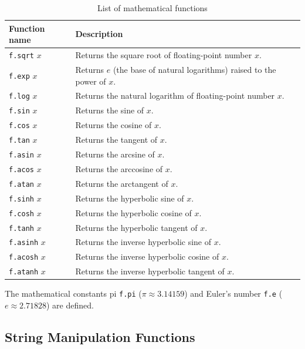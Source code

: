 \begin{table}[h]
  \begin{center}
    \begin{tabular}{ | l | p{9cm} |}
    \hline
    Function name & Description \\ \hline
    \texttt{f.sqrt} $x$ & Returns the square root of floating-point number $x$. \\ \hline
    \texttt{f.exp} $x$ & Returns $e$ (the base of natural logarithms) raised to the power of $x$. \\ \hline
    \texttt{f.log} $x$ & Returns the natural logarithm of floating-point number $x$. \\ \hline
    \texttt{f.sin} $x$ & Returns the sine of $x$. \\ \hline
    \texttt{f.cos} $x$ & Returns the cosine of $x$. \\ \hline
    \texttt{f.tan} $x$ & Returns the tangent of $x$. \\ \hline
    \texttt{f.asin} $x$ & Returns the arcsine of $x$. \\ \hline
    \texttt{f.acos} $x$ & Returns the arccosine of $x$. \\ \hline
    \texttt{f.atan} $x$ & Returns the arctangent of $x$. \\ \hline
    \texttt{f.sinh} $x$ & Returns the hyperbolic sine of $x$. \\ \hline
    \texttt{f.cosh} $x$ & Returns the hyperbolic cosine of $x$. \\ \hline
    \texttt{f.tanh} $x$ & Returns the hyperbolic tangent of $x$. \\ \hline
    \texttt{f.asinh} $x$ & Returns the inverse hyperbolic sine of $x$. \\ \hline
    \texttt{f.acosh} $x$ & Returns the inverse hyperbolic cosine of $x$. \\ \hline
    \texttt{f.atanh} $x$ & Returns the inverse hyperbolic tangent of $x$. \\ \hline
    \end{tabular}
\end{center}
    \caption{List of mathematical functions}
    \label{tab:mathFunctions}
\end{table}

The mathematical constants pi \lstinline{f.pi} ($\pi \approx 3.14159$) and Euler's number \lstinline{f.e} ($e \approx 2.71828$) are defined.

\subsection{String Manipulation Functions}

